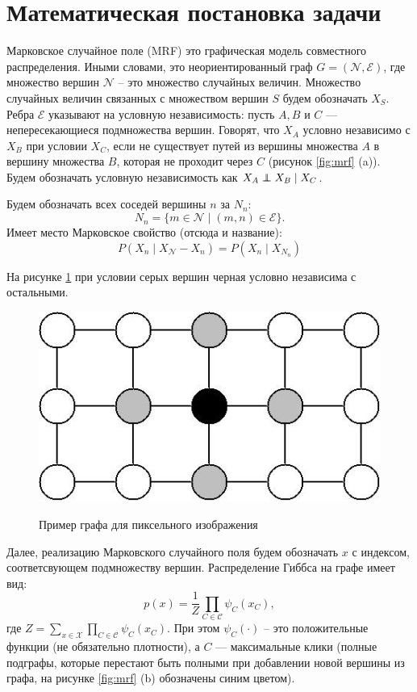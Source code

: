 \documentclass[12pt]{article}
\newcommand\independent{\protect\mathpalette{\protect\independenT}{\perp}}
\def\independenT#1#2{\mathrel{\rlap{$#1#2$}\mkern2mu{#1#2}}}
\begin{document}
\section{Математическая постановка задачи} 
Марковское случайное поле (MRF) это графическая модель совместного распределения. Иными словами, это неориентированный граф $G = (\mathcal{N}, \mathcal{E})$, где множество вершин $\mathcal{N}$ -- это множество случайных величин. 
Множество случайных величин связанных с множеством вершин $S$ будем обозначать $X_S$. Ребра $\mathcal{E}$ указывают на условную независимость: пусть $A, B$ и $C$ --- непересекающиеся подмножества вершин. Говорят, что $X_A$ условно независимо с $X_B$ при условии $X_C$, если не существует путей из вершины множества $A$ в вершину множества $B$, которая не проходит через $C$ (рисунок \ref{fig:mrf} (a)). Будем обозначать условную независимость как $X_A \independent X_B \mid X_C$.

Будем обозначать всех соседей вершины $n$ за $N_n$: 
\begin{equation*}
N_n = \{ m \in \mathcal{N} \mid (m, n) \in \mathcal{E}\}.
\end{equation*}
Имеет место Марковское свойство (отсюда и название):
\begin{equation*}
P(X_n \mid X_\mathcal{N} - X_n) = P(X_n \mid X_{N_n})
\end{equation*}

На рисунке \ref{fig:example} при условии серых вершин черная условно независима с остальными.

\begin{figure}[hhh]
\centering
\includegraphics[width=.5\linewidth]{figures/blanket.jpg}
\label{fig:example}
\caption{Пример графа для пиксельного изображения}
\end{figure}


Далее, реализацию Марковского случайного поля будем обозначать $x$ с индексом, соответсвующем подмножеству вершин.
Распределение Гиббса на графе имеет вид:
\begin{equation}
p(x) = \frac{1}{Z} \prod\limits_{C \in \mathcal{C}} \psi_C(x_C), 
\label{eqn:jointdens}
\end{equation}
где $Z  = \sum\limits_{x \in \mathcal{X}} \prod\limits_{C \in \mathcal{C}} \psi_C(x_C)$.
При этом $\psi_C(\cdot)$ -- это положительные функции (не обязательно плотности), а $C$ --- максимальные клики (полные подграфы, которые перестают быть полными при добавлении новой вершины из графа, на рисунке \ref{fig:mrf} (b) обозначены синим цветом).
\end{document}

